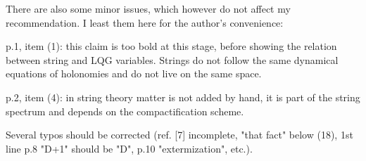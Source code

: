 \documentclass[11pt]{article}
\begin{document}
There are also some minor issues, which however do not affect my recommendation. I least them here for the author's convenience:

p.1, item (1): this claim is too bold at this stage, before showing the relation between string and LQG variables. Strings do not follow the same dynamical equations of holonomies and do not live on the same space.

p.2, item (4): in string theory matter is not added by hand, it is part of the string spectrum and depends on the compactification scheme.

Several typos should be corrected (ref. [7] incomplete, "that fact" below (18), 1st line p.8 "D+1" should be "D", p.10 "extermization", etc.).
\end{document}
